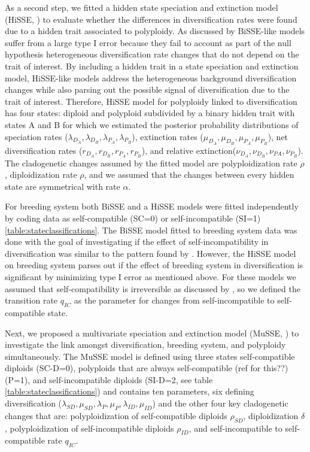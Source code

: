 
As a second step, we fitted a hidden state speciation and extinction model (HiSSE, \citet{beaulieu_2016}) to evaluate whether the differences in diversification rates were found due to a hidden trait associated to polyploidy.
As discussed by \citet{beaulieu_2016} BiSSE-like models suffer from a large type I error because they fail to account as part of the null hypothesis heterogeneous diversification rate changes  that do not depend on the trait of interest.
By including a hidden trait in a state speciation and extinction  model,  HiSSE-like models address the heterogeneous background diversification changes while also parsing out the possible signal of diversification due to the trait of interest. 
Therefore, HiSSE model for polyploidy linked to diversification has four states: diploid and polyploid subdivided by a binary hidden trait with states A and B for which we estimated the posterior probability distributions of speciation rates ($\lambda_{D_A},\lambda_{D_B}, \lambda_{P_A},\lambda_{P_B}$), extinction rates ($\mu_{D_A},\mu_{D_B}, \mu_{P_A},\mu_{P_B}$),  net diversification rates ($r_{D_A},r_{D_B},r_{P_A},r_{P_B}$), and relative extinction($\nu_{D_A},\nu_{D_B}, \nu_{PA},\nu_{P_B}$).
The cladogenetic changes assumed by the fitted model are polyploidization rate $\rho$, diploidization rate $\rho$, and we assumed that the changes between every hidden state are symmetrical with rate $\alpha$.

For breeding system both BiSSE and a HiSSE models were fitted independently by coding data as self-compatible (SC=0) or self-incompatible (SI=1) \cref{table:stateclassifications}.
The BiSSE model fitted to breeding system data was done with the goal of investigating if the effect of self-incompatibility in diversification was similar to the pattern found by \citet{goldberg_2012}.
However, the HiSSE model on breeding system parses out if the effect of breeding system in diversification is significant  by minimizing type I error as mentioned above.
For these models we assumed that self-compatibility is irreversible as discussed by \citet{igic_2013}, so we defined the transition rate $q_{IC}$ as the parameter for changes from self-incompatible to self-compatible state.

Next, we proposed a multivariate speciation and extinction model (MuSSE, \citet{fitzjohn_2012}) to investigate the link amongst diversification, breeding system, and polyploidy simultaneously.
The MuSSE model is defined using three states self-compatible diploids (SC-D=0), polyploids that are always self-compatible (ref for this??) (P=1), and self-incompatible diploids (SI-D=2, see table \cref{table:stateclassifications}) and contains ten parameters, six defining diversification ($\lambda_{SD}, \mu_{SD},\lambda_{P},\mu_{P}, \lambda_{ID},\mu_{ID}$) and the other four key cladogenetic changes that are: polyploidization of self-compatible diploids $\rho_{SD}$, diploidization $\delta$, polyploidization of self-incompatible diploids $\rho_{ID}$, and self-incompatible to self-compatible rate $q_{IC}$.


